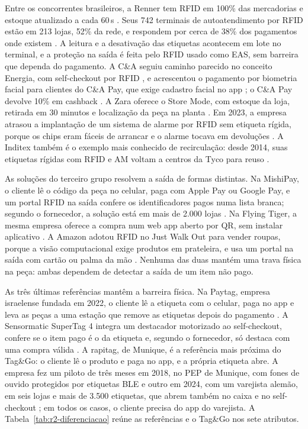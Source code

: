 Entre os concorrentes brasileiros, a Renner tem RFID em 100\% das mercadorias e estoque atualizado a cada 60\,s \cite{infomoney2024renner}. Seus 742 terminais de autoatendimento por RFID estão em 213 lojas, 52\% da rede, e respondem por cerca de 38\% dos pagamentos onde existem \cite{consumidormoderno2025renner}. A leitura e a desativação das etiquetas acontecem em lote no terminal, e a proteção na saída é feita pelo RFID usado como EAS, sem barreira que dependa do pagamento. A C\&A seguiu caminho parecido no conceito Energia, com self-checkout por RFID \cite{brazileconomy2025cea}, e acrescentou o pagamento por biometria facial para clientes do C\&A Pay, que exige cadastro facial no app \cite{mobiletime2023cea}; o C\&A Pay devolve 10\% em cashback \cite{cea2026pay}. A Zara oferece o Store Mode, com estoque da loja, retirada em 30 minutos e localização da peça na planta \cite{inditex2021storemode}. Em 2023, a empresa atrasou a implantação de um sistema de alarme por RFID sem etiqueta rígida, porque os chips eram fáceis de arrancar e o alarme tocava em devoluções \cite{pymnts2023zara}. A Inditex também é o exemplo mais conhecido de recirculação: desde 2014, suas etiquetas rígidas com RFID e AM voltam a centros da Tyco para reuso \cite{rfidjournal2014inditex}.

As soluções do terceiro grupo resolvem a saída de formas distintas. Na MishiPay, o cliente lê o código da peça no celular, paga com Apple Pay ou Google Pay, e um portal RFID na saída confere os identificadores pagos numa lista branca; segundo o fornecedor, a solução está em mais de 2.000 lojas \cite{mishipay2026apparel}. Na Flying Tiger, a mesma empresa oferece a compra num web app aberto por QR, sem instalar aplicativo \cite{mishipay2026flyingtiger}. A Amazon adotou RFID no Just Walk Out para vender roupas, porque a visão computacional exige produtos em prateleira, e usa um portal na saída com cartão ou palma da mão \cite{amazon2024jwo}. Nenhuma das duas mantém uma trava física na peça: ambas dependem de detectar a saída de um item não pago.

As três últimas referências mantêm a barreira física. Na Paytag, empresa israelense fundada em 2022, o cliente lê a etiqueta com o celular, paga no app e leva as peças a uma estação que remove as etiquetas depois do pagamento \cite{calcalist2026paytag}. A Sensormatic SuperTag 4 integra um destacador motorizado ao self-checkout, confere se o item pago é o da etiqueta e, segundo o fornecedor, só destaca com uma compra válida \cite{sensormatic2026supertag}. A rapitag, de Munique, é a referência mais próxima do Tag\&Go: o cliente lê o produto e paga no app, e a própria etiqueta abre. A empresa fez um piloto de três meses em 2018, no PEP de Munique, com fones de ouvido protegidos por etiquetas BLE \cite{storesshops2019rapitag} e outro em 2024, com um varejista alemão, em seis lojas e mais de 3.500 etiquetas, que abrem também no caixa e no self-checkout \cite{eurocis2024rapitag}; em todos os casos, o cliente precisa do app do varejista. A Tabela~\ref{tab:r2-diferenciacao} reúne as referências e o Tag\&Go nos sete atributos.

